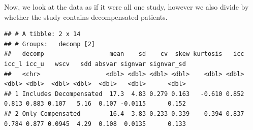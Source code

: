 \documentclass[
]{article}
\newenvironment{Shaded}{\begin{snugshade}}{\end{snugshade}}
\newcommand{\AttributeTok}[1]{\textcolor[rgb]{0.77,0.63,0.00}{#1}}
\newcommand{\DecValTok}[1]{\textcolor[rgb]{0.00,0.00,0.81}{#1}}
\newcommand{\FunctionTok}[1]{\textcolor[rgb]{0.00,0.00,0.00}{#1}}
\newcommand{\NormalTok}[1]{#1}
\newcommand{\OtherTok}[1]{\textcolor[rgb]{0.56,0.35,0.01}{#1}}
\newcommand{\SpecialCharTok}[1]{\textcolor[rgb]{0.00,0.00,0.00}{#1}}
\newcommand{\StringTok}[1]{\textcolor[rgb]{0.31,0.60,0.02}{#1}}
\begin{document}
Now, we look at the data as if it were all one study, however we also
divide by whether the study contains decompensated patients.

\begin{Shaded}
\end{Shaded}

\begin{verbatim}
## # A tibble: 2 x 14
## # Groups:   decomp [2]
##   decomp                  mean    sd    cv  skew kurtosis   icc icc_l icc_u   wscv   sdd absvar signvar signvar_sd
##   <chr>                  <dbl> <dbl> <dbl> <dbl>    <dbl> <dbl> <dbl> <dbl>  <dbl> <dbl>  <dbl>   <dbl>      <dbl>
## 1 Includes Decompensated  17.3  4.83 0.279 0.163   -0.610 0.852 0.813 0.883 0.107   5.16  0.107 -0.0115      0.152
## 2 Only Compensated        16.4  3.83 0.233 0.339   -0.394 0.837 0.784 0.877 0.0945  4.29  0.108  0.0135      0.133
\end{verbatim}
\end{document}
